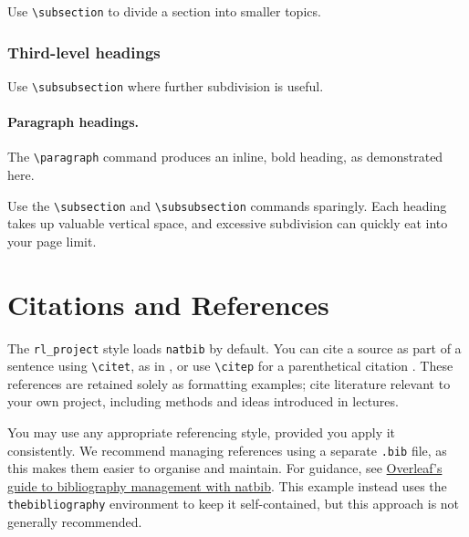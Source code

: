 \documentclass[letterpaper]{article}
\begin{document}
Use \verb|\subsection| to divide a section into smaller topics.

\subsubsection{Third-level headings}

Use \verb|\subsubsection| where further subdivision is useful.

\paragraph{Paragraph headings.}

The \verb|\paragraph| command produces an inline, bold heading, as demonstrated here.

Use the \verb|\subsection| and \verb|\subsubsection| commands sparingly. Each heading takes up valuable vertical space, and excessive subdivision can quickly eat into your page limit.

\section{Citations and References}

The \verb|rl_project| style loads \verb|natbib| by default. You can cite a source as part of a sentence using \verb|\citet|, as in \citet{hasselmo1995}, or use \verb|\citep| for a parenthetical citation \citep{alexander1995}. These references are retained solely as formatting examples; cite literature relevant to your own project, including methods and ideas introduced in lectures.

You may use any appropriate referencing style, provided you apply it consistently. We recommend managing references using a separate \verb|.bib| file, as this makes them easier to organise and maintain. For guidance, see \href{https://www.overleaf.com/learn/latex/Bibliography_management_with_natbib}{Overleaf's guide to bibliography management with natbib}. This example instead uses the \verb|thebibliography| environment to keep it self-contained, but this approach is not generally recommended.
\end{document}
